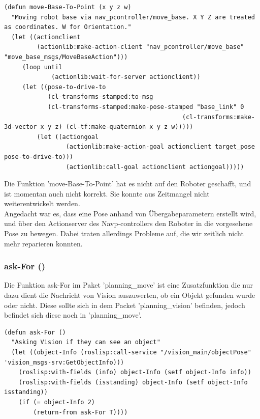 \documentclass{suturo}
\begin{document}
\noindent
\begin{minipage}{\linewidth}
\begin{lstlisting}
(defun move-Base-To-Point (x y z w)
  "Moving robot base via nav_pcontroller/move_base. X Y Z are treated as coordinates. W for Orientation."
  (let ((actionclient 
         (actionlib:make-action-client "nav_pcontroller/move_base" "move_base_msgs/MoveBaseAction")))
     (loop until
             (actionlib:wait-for-server actionclient))
     (let ((pose-to-drive-to 
            (cl-transforms-stamped:to-msg 
            (cl-transforms-stamped:make-pose-stamped "base_link" 0 
                                                 (cl-transforms:make-3d-vector x y z) (cl-tf:make-quaternion x y z w)))))
         (let ((actiongoal 
                 (actionlib:make-action-goal actionclient target_pose pose-to-drive-to)))
                 (actionlib:call-goal actionclient actiongoal)))))
\end{lstlisting}
\end{minipage}

Die Funktion 'move-Base-To-Point' hat es nicht auf den Roboter geschafft, und ist momentan auch nicht korrekt. Sie konnte aus Zeitmangel nicht weiterentwickelt werden.\\
Angedacht war es, dass eine Pose anhand von Übergabeparametern erstellt wird, und über den Actionserver des Navp-controllers den Roboter in die vorgesehene Pose zu bewegen. Dabei traten allerdings Probleme auf, die wir zeitlich nicht mehr reparieren konnten.


\subsubsection{ask-For ()}

Die Funktion ask-For im Paket 'planning\_move' ist eine Zusatzfunktion die nur dazu dient die Nachricht von Vision auszuwerten, ob ein Objekt gefunden wurde oder nicht. Diese sollte sich in dem Packet 'planning\_vision' befinden, jedoch befindet sich diese noch in 'planning\_move'.

\noindent
\begin{minipage}{\linewidth}
\begin{lstlisting}
(defun ask-For ()
  "Asking Vision if they can see an object"
  (let ((object-Info (roslisp:call-service "/vision_main/objectPose" 'vision_msgs-srv:GetObjectInfo)))
    (roslisp:with-fields (info) object-Info (setf object-Info info))
    (roslisp:with-fields (isstanding) object-Info (setf object-Info isstanding))
    (if (= object-Info 2)
        (return-from ask-For T))))
\end{lstlisting}
\end{minipage}
\end{document}
